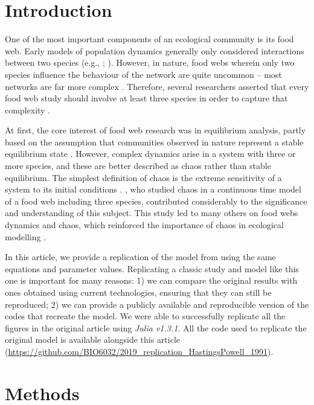 
\section{Introduction}

One of the most important components of an ecological community is its food web.
Early models of population dynamics generally only considered interactions between
two species (e.g., \citet{canale1970}; \citet{rosenzweig1963}). However, in nature, food webs wherein only
two species influence the behaviour of the network are quite uncommon -- most
networks are far more complex \citep{hastings1991}. Therefore, several researchers asserted
that every food web study should involve at least three species in order to capture that
complexity \citep{price1980, rosenzweig1973}.

At first, the core interest of food web research was in equilibrium analysis, partly based
on the assumption that communities observed in nature represent a stable equilibrium state
\citep{hastings1993}.
However, complex dynamics arise in a system with three or more species, and these are better
described as chaos rather than stable equilibrium.
The simplest definition of chaos is the extreme sensitivity of a system to its
initial conditions \citep{hastings1993}.
\citet{hastings1991}, who studied chaos in a continuous time model of a food web including
three species, contributed considerably to the significance and understanding of this subject.
This study led to many others on food webs dynamics and chaos, which reinforced
the importance of chaos in ecological modelling \citep{blasius1999, gakkhar2012}.

In this article, we provide a replication of the model from \citet{hastings1991} using the
same equations and parameter values.
Replicating a classic study and model like this one is important for many reasons:
1) we can compare the original results with ones obtained using current technologies,
ensuring that they can still be reproduced;
2) we can provide a publicly available and reproducible version of the codes that recreate
the model.
We were able to successfully replicate all the figures in the original article using
\textit{Julia v1.3.1}.
All the code used to replicate the original model is available alongside this article
(\url{https://github.com/BIO6032/2019_replication_HastingsPowell_1991}).

\section{Methods}

